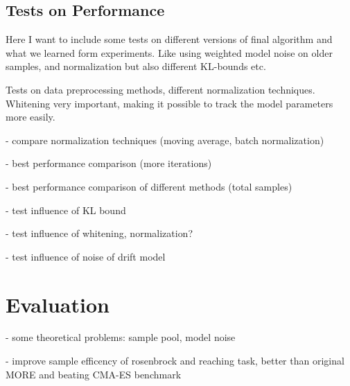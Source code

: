 
\subsection{Tests on Performance}
Here I want to include some tests on different versions
of final algorithm and what we learned form experiments.
Like using weighted model noise on older samples, and
normalization but also different KL-bounds etc.


Tests on data preprocessing methods, different normalization techniques.
Whitening very important, making it possible to track the model parameters
more easily.

- compare normalization techniques (moving average, batch normalization)

- best performance comparison (more iterations)

- best performance comparison of different methods (total samples)

- test influence of KL bound

- test influence of whitening, normalization?

- test influence of noise of drift model

\section{Evaluation}
- some theoretical problems: sample pool, model noise

- improve sample efficency of rosenbrock and reaching task,
better than original MORE and beating CMA-ES benchmark

